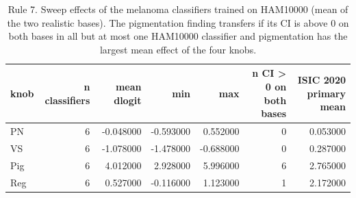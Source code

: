 \begin{table}
\caption{Rule 7. Sweep effects of the melanoma classifiers trained on HAM10000 (mean of the two realistic bases). The pigmentation finding transfers if its CI is above 0 on both bases in all but at most one HAM10000 classifier and pigmentation has the largest mean effect of the four knobs.}
\label{tab:T9_ham10000}
\begin{tabular}{lrrrrrr}
\toprule
knob & n classifiers & mean dlogit & min & max & n CI > 0 on both bases & ISIC 2020 primary mean \\
\midrule
PN & 6 & -0.048000 & -0.593000 & 0.552000 & 0 & 0.053000 \\
VS & 6 & -1.078000 & -1.478000 & -0.688000 & 0 & 0.287000 \\
Pig & 6 & 4.012000 & 2.928000 & 5.996000 & 6 & 2.765000 \\
Reg & 6 & 0.527000 & -0.116000 & 1.123000 & 1 & 2.172000 \\
\bottomrule
\end{tabular}
\end{table}
